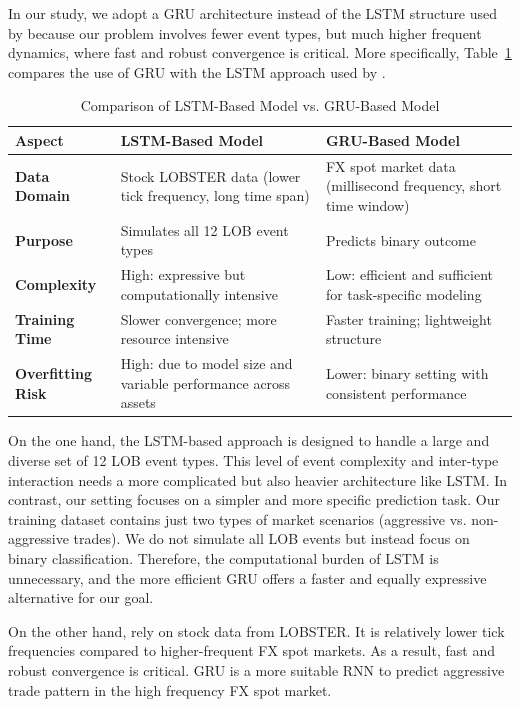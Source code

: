 In our study, we adopt a GRU architecture instead of the LSTM structure used by \cite{lalor2025eventbasedlimitorderbook} because our problem involves fewer event types, but much higher frequent dynamics, where fast and robust convergence is critical. More specifically, Table~\ref{tab:gru_vs_lstm} compares the use of GRU with the LSTM approach used by \cite{lalor2025eventbasedlimitorderbook}.

\begin{table}[H]
\centering
\caption{Comparison of LSTM-Based Model vs. GRU-Based Model}
\begin{tabular}{p{3cm} p{5.5cm} p{5.5cm}}
\toprule
\textbf{Aspect} & \textbf{LSTM-Based Model} & \textbf{GRU-Based Model} \\
\midrule
\textbf{Data Domain} & Stock LOBSTER data (lower tick frequency, long time span) & FX spot market data (millisecond frequency, short time window) \\
\textbf{Purpose} & Simulates all 12 LOB event types & Predicts binary outcome \\
\textbf{Complexity} & High: expressive but computationally intensive & Low: efficient and sufficient for task-specific modeling \\
\textbf{Training Time} & Slower convergence; more resource intensive & Faster training; lightweight structure \\
\textbf{Overfitting Risk} & High: due to model size and variable performance across assets & Lower: binary setting with consistent performance \\
\bottomrule
\end{tabular}
\label{tab:gru_vs_lstm}
\end{table}

On the one hand, the LSTM-based approach is designed to handle a large and diverse set of 12 LOB event types. This level of event complexity and inter-type interaction needs a more complicated but also heavier architecture like LSTM. In contrast, our setting focuses on a simpler and more specific prediction task. Our training dataset contains just two types of market scenarios (aggressive vs. non-aggressive trades). We do not simulate all LOB events but instead focus on binary classification. Therefore, the computational burden of LSTM is unnecessary, and the more efficient GRU offers a faster and equally expressive alternative for our goal.

On the other hand, \cite{lalor2025eventbasedlimitorderbook} rely on stock data from LOBSTER. It is relatively lower tick frequencies compared to higher-frequent FX spot markets. As a result, fast and robust convergence is critical. GRU is a more suitable RNN to predict aggressive trade pattern in the high frequency FX spot market.


